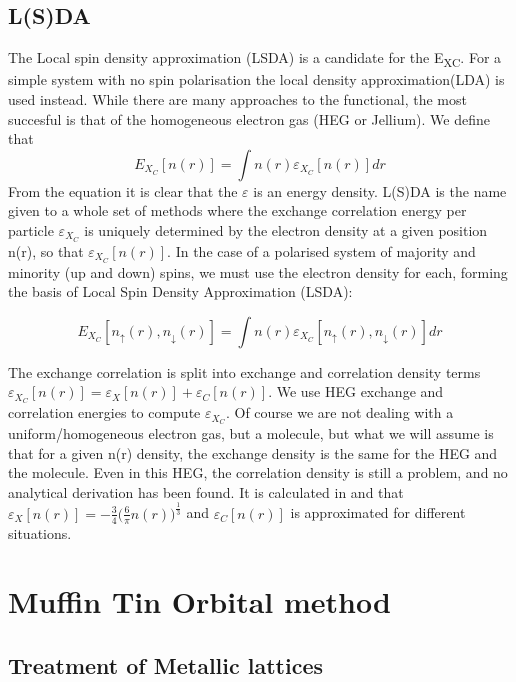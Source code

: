 \documentclass[12pt]{article}
\begin{document}
\subsection{L(S)DA}

The Local spin density approximation (LSDA) is a candidate for the E\textsubscript{XC}. For a simple system with no spin polarisation the local density approximation(LDA) is used instead. While there are many approaches to the functional, the most succesful is that of the homogeneous electron gas (HEG or Jellium).\cite{inhom}\cite{martin}
We define that
$$E_X_C[n(r)]=\int n(r) \varepsilon_X_C[n(r)] dr$$
From the equation it is clear that the $\varepsilon$ is an energy density. L(S)DA is the name given to a whole set of methods where the exchange correlation energy per particle $\varepsilon_X_C$ is uniquely determined by the electron density at a given position n(r), so that $\varepsilon_X_C[n(r)]$.
In the case of a polarised system of majority and minority (up and down) spins, we must use the electron density for each, forming the basis of Local Spin Density Approximation (LSDA):

$$E_X_C[n_\uparrow(r),n_\downarrow(r)]=\int n(r) \varepsilon_X_C[n_\uparrow(r),n_\downarrow(r)] dr$$


The exchange correlation is split into exchange and correlation density terms $\varepsilon_X_C[n(r)]=\varepsilon_X[n(r)]+\varepsilon_C[n(r)]$.
We use HEG exchange and correlation energies to compute $\varepsilon_X_C$. Of course we are not dealing with a uniform/homogeneous electron gas, but a molecule, but what we will assume is that for a given n(r) density, the exchange density is the same for the HEG and the molecule. Even in this HEG, the correlation density is still a problem, and no analytical derivation has been found. It is calculated in \cite{martin} and \cite{exc} that $\varepsilon_X[n(r)]=-\frac{3}{4}\bigg(\frac{6}{\pi}n(r)\bigg)^\frac{1}{3}$ and $\varepsilon_C[n(r)]$ is approximated for different situations.

\clearpage
\section{Muffin Tin Orbital method}%
\subsection{Treatment of Metallic lattices}
\end{document}
